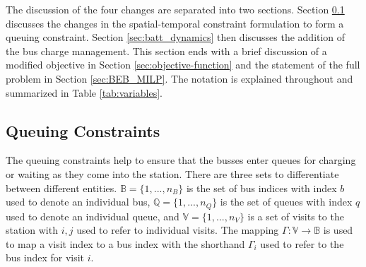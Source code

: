 \documentclass[letterpaper, 10pt, conference]{IEEEtran}
\begin{document}


The discussion of the four changes are separated into two sections. Section \ref{sec:queuing} discusses the changes in the spatial-temporal constraint formulation to form a queuing constraint. Section \ref{sec:batt_dynamics} then discusses the addition of the bus charge management. This section ends with a brief discussion of a modified objective in Section \ref{sec:objective-function} and the statement of the full problem in Section \ref{sec:BEB_MILP}. The notation is explained throughout and summarized in Table \ref{tab:variables}.

\subsection{Queuing Constraints}
\label{sec:queuing}
\noindent
The queuing constraints help to ensure that the busses enter queues for charging or waiting as they come into the station. There are three sets to differentiate between different entities. $\mathbb{B} = \{1, ..., n_B\}$ is the set of bus indices with index $b$ used to denote an individual bus, $\mathbb{Q} = \{1, ..., n_Q\}$ is the set of queues with index $q$ used to denote an individual queue, and $\mathbb{V} = \{1, ..., n_V\}$ is a set of visits to the station with $i,j$ used to refer to individual visits. The mapping $\Gamma: \mathbb{V} \rightarrow \mathbb{B}$ is used to map a visit index to a bus index with the shorthand $\Gamma_i$ used to refer to the bus index for visit $i$.
\end{document}
